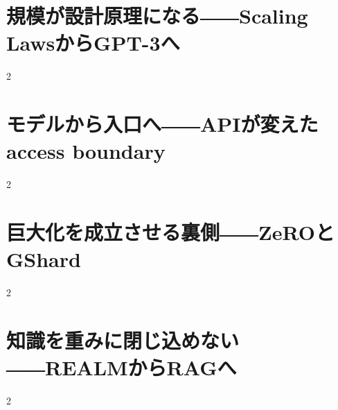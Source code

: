 \documentclass[lualatex,a4paper,11pt]{jlreq}
\begin{document}
\surveycover
\clearpage


\clearpage
\section{規模が設計原理になる――Scaling LawsからGPT-3へ}
\label{pkg:scale-laws-gpt3}
\vspace{0.15em}

\vspace{0.20em}
\begin{multicols}{2}

\end{multicols}

\medskip


\Needspace{0.45\textheight}
\bigskip
\section{モデルから入口へ――APIが変えたaccess boundary}
\label{pkg:access-api}
\vspace{0.15em}

\vspace{0.20em}
\begin{multicols}{2}

\end{multicols}

\medskip


\Needspace{0.45\textheight}
\bigskip
\section{巨大化を成立させる裏側――ZeROとGShard}
\label{pkg:systems-scale}
\vspace{0.15em}

\vspace{0.20em}
\begin{multicols}{2}

\end{multicols}

\medskip


\Needspace{0.45\textheight}
\bigskip
\section{知識を重みに閉じ込めない――REALMからRAGへ}
\label{pkg:retrieval-grounding}
\vspace{0.15em}

\vspace{0.20em}
\begin{multicols}{2}

\end{multicols}

\medskip

\end{document}
